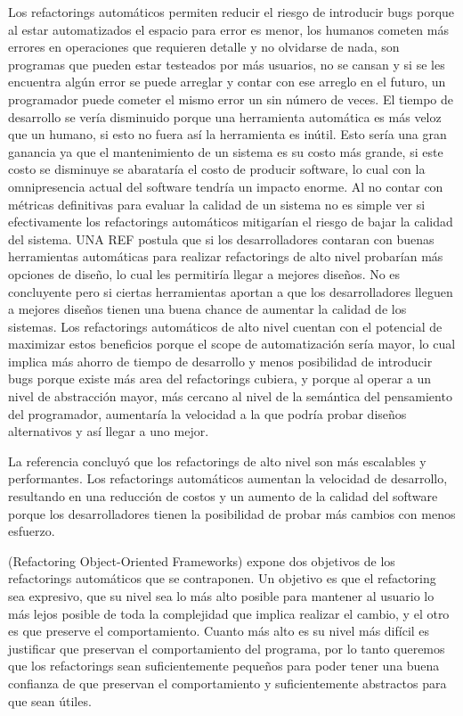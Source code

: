 Los refactorings automáticos permiten reducir el riesgo de introducir bugs porque al estar
automatizados el espacio para error es menor, los humanos cometen más errores en operaciones que
requieren detalle y no olvidarse de nada, son programas que pueden estar testeados por más usuarios,
no se cansan y si se les encuentra algún error se puede arreglar y contar con ese arreglo en el
futuro, un programador puede cometer el mismo error un sin número de veces. El tiempo de desarrollo
se vería disminuido porque una herramienta automática es más veloz que un humano, si esto no fuera
así la herramienta es inútil. Esto sería una gran ganancia ya que el mantenimiento de un sistema es
su costo más grande, si este costo se disminuye se abarataría el costo de producir software, lo cual
con la omnipresencia actual del software tendría un impacto enorme. Al no contar con métricas
definitivas para evaluar la calidad de un sistema no es simple ver si efectivamente los refactorings
automáticos mitigarían el riesgo de bajar la calidad del sistema.
UNA REF postula que si los desarrolladores contaran con buenas herramientas automáticas para
realizar refactorings de alto nivel probarían más opciones de diseño, lo cual les permitiría llegar
a mejores diseños. No es concluyente pero si ciertas herramientas aportan a que los desarrolladores
lleguen a mejores diseños tienen una buena chance de aumentar la calidad de los sistemas.
Los refactorings automáticos de alto nivel cuentan con el potencial de maximizar estos beneficios
porque el scope de automatización sería mayor, lo cual implica más ahorro de tiempo de desarrollo y
menos posibilidad de introducir bugs porque existe más area del refactorings cubiera, y porque al
operar a un nivel de abstracción mayor, más cercano al nivel de la semántica del pensamiento del
programador, aumentaría la velocidad a la que podría probar diseños alternativos y así llegar a uno
mejor.

La referencia concluyó que los refactorings de alto nivel son más escalables y performantes.
Los refactorings automáticos aumentan la velocidad de desarrollo, resultando en una reducción de
costos y un aumento de la calidad del software porque los desarrolladores tienen la posibilidad de
probar más cambios con menos esfuerzo.

(Refactoring Object-Oriented Frameworks) expone dos objetivos de los refactorings automáticos que se
contraponen. Un objetivo es que el refactoring sea expresivo, que su nivel sea lo más alto posible
para mantener al usuario lo más lejos posible de toda la complejidad que implica realizar el cambio,
y el otro es que preserve el comportamiento. Cuanto más alto es su nivel más difícil es justificar que
preservan el comportamiento del programa, por lo tanto queremos que los refactorings sean
suficientemente pequeños para poder tener una buena confianza de que preservan el comportamiento y
suficientemente abstractos para que sean útiles.  

